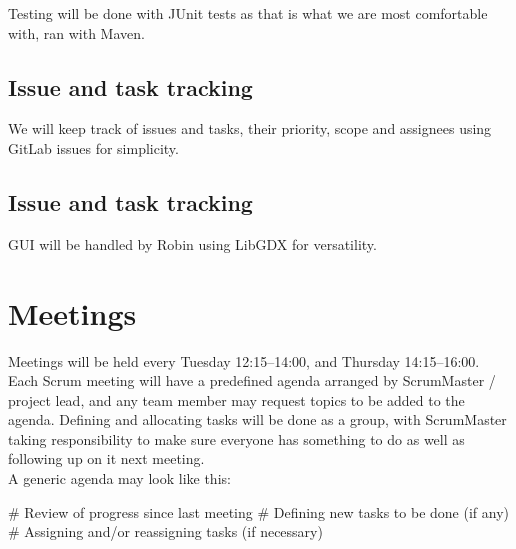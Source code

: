 \documentclass{article}
\begin{document}
Testing will be done with JUnit tests as that is what we are most comfortable with, ran with Maven.

\subsection*{Issue and task tracking}

We will keep track of issues and tasks, their priority, scope and assignees using GitLab issues for simplicity.

\subsection*{Issue and task tracking}

GUI will be handled by Robin using LibGDX for versatility.

\section*{Meetings}

Meetings will be held every Tuesday 12:15--14:00, and Thursday 14:15--16:00. Each Scrum meeting will have a predefined agenda arranged by ScrumMaster / project lead, and any team member may request topics to be added to the agenda. Defining and allocating tasks will be done as a group, with ScrumMaster taking responsibility to make sure everyone has something to do as well as following up on it next meeting.\\

A generic agenda may look like this:\\

\begin{easylist}[enumerate]
    # Review of progress since last meeting
    # Defining new tasks to be done (if any)
    # Assigning and/or reassigning tasks (if necessary)
\end{easylist}
\end{document}
